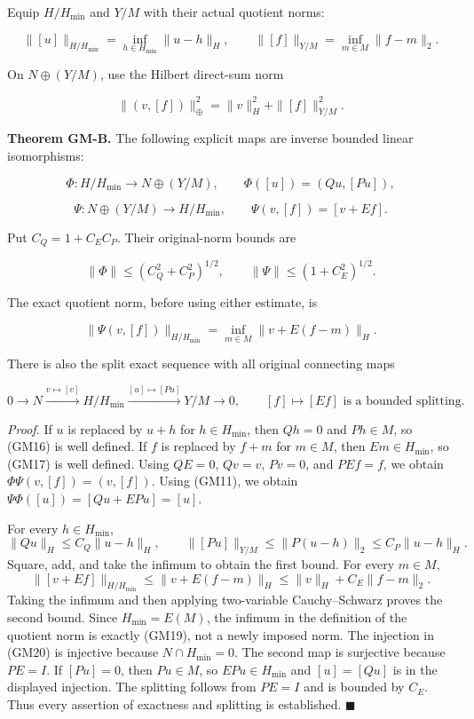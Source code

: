 \documentclass[
  11pt,
]{article}
\begin{document}
Equip \(H/H_{\min}\) and \(Y/M\) with
their actual quotient norms:

\[
 \|[u]\|_{H/H_{\min}}=\inf_{h\in H_{\min}}\|u-h\|_H,
 \qquad
 \|[f]\|_{Y/M}=\inf_{m\in M}\|f-m\|_2.
 \tag{GM14}
\]

On \(N\oplus(Y/M)\), use the Hilbert direct-sum norm

\[
 \|(v,[f])\|_\oplus^2=\|v\|_H^2+\|[f]\|_{Y/M}^2.
 \tag{GM15}
\]

\textbf{Theorem GM-B.} The following explicit maps are inverse bounded
linear isomorphisms:

\[
 \Phi:H/H_{\min}\longrightarrow N\oplus(Y/M),
 \qquad \Phi([u])=(Qu,[Pu]),
 \tag{GM16}
\]

\[
 \Psi:N\oplus(Y/M)\longrightarrow H/H_{\min},
 \qquad \Psi(v,[f])=[v+Ef].
 \tag{GM17}
\]

Put \(C_Q=1+C_EC_P\). Their original-norm bounds are

\[
 \|\Phi\|\leq(C_Q^2+C_P^2)^{1/2},
 \qquad
 \|\Psi\|\leq(1+C_E^2)^{1/2}.
 \tag{GM18}
\]

The exact quotient norm, before using either estimate, is

\[
 \|\Psi(v,[f])\|_{H/H_{\min}}
       =\inf_{m\in M}\|v+E(f-m)\|_H.
 \tag{GM19}
\]

There is also the split exact sequence with all original connecting maps

\[
 0\longrightarrow N
 \xrightarrow{v\mapsto[v]}H/H_{\min}
 \xrightarrow{[u]\mapsto[Pu]}Y/M
 \longrightarrow0,
 \qquad [f]\mapsto[Ef]
 \text{ is a bounded splitting.}
 \tag{GM20}
\]

\emph{Proof.} If \(u\) is replaced by
\(u+h\) for \(h\in H_{\min}\), then
\(Qh=0\) and \(Ph\in M\), so (GM16) is
well defined. If \(f\) is replaced by
\(f+m\) for \(m\in M\), then
\(Em\in H_{\min}\), so (GM17) is well defined. Using
\(QE=0\), \(Qv=v\),
\(Pv=0\), and \(PEf=f\), we obtain
\(\Phi\Psi(v,[f])=(v,[f])\). Using (GM11), we obtain
\(\Psi\Phi([u])=[Qu+EPu]=[u]\).

For every \(h\in H_{\min}\), \[
 \|Qu\|_H\leq C_Q\|u-h\|_H,
 \qquad \|[Pu]\|_{Y/M}\leq\|P(u-h)\|_2\leq C_P\|u-h\|_H.
\] Square,
add, and take the infimum to obtain the first bound. For every
\(m\in M\), \[
 \|[v+Ef]\|_{H/H_{\min}}
  \leq\|v+E(f-m)\|_H
  \leq\|v\|_H+C_E\|f-m\|_2.
\] Taking the
infimum and then applying two-variable Cauchy--Schwarz proves the second
bound. Since \(H_{\min}=E(M)\), the infimum in the definition
of the quotient norm is exactly (GM19), not a newly imposed norm. The
injection in (GM20) is injective because \(N\cap H_{\min}=0\). The
second map is surjective because \(PE=I\). If
\([Pu]=0\), then \(Pu\in M\), so
\(EPu\in H_{\min}\) and \([u]=[Qu]\) is in the
displayed injection. The splitting follows from
\(PE=I\) and is bounded by \(C_E\).
Thus every assertion of exactness and splitting is established.
\hfill\ensuremath{\blacksquare}
\end{document}
